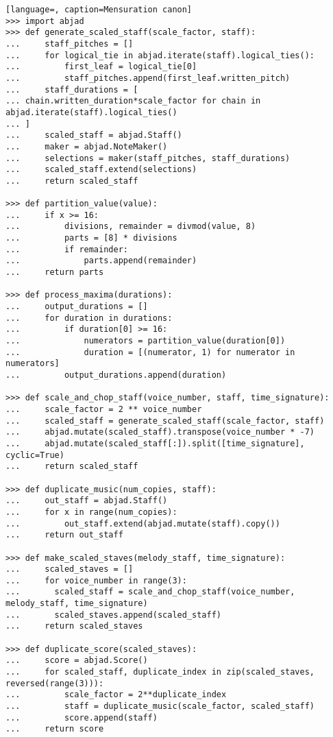 \singlespace
\begin{lstlisting}[language=, caption=Mensuration canon]
>>> import abjad
>>> def generate_scaled_staff(scale_factor, staff):
...     staff_pitches = []
...     for logical_tie in abjad.iterate(staff).logical_ties():
...         first_leaf = logical_tie[0]
...         staff_pitches.append(first_leaf.written_pitch)
...     staff_durations = [
...	chain.written_duration*scale_factor for chain in abjad.iterate(staff).logical_ties()
...	]
...     scaled_staff = abjad.Staff()
...     maker = abjad.NoteMaker()
...     selections = maker(staff_pitches, staff_durations)
...     scaled_staff.extend(selections)
...     return scaled_staff

>>> def partition_value(value):
...     if x >= 16:
...         divisions, remainder = divmod(value, 8)
...         parts = [8] * divisions
...         if remainder:
...             parts.append(remainder)
...     return parts

>>> def process_maxima(durations):
...     output_durations = []
...     for duration in durations:
...         if duration[0] >= 16:
...             numerators = partition_value(duration[0])
...             duration = [(numerator, 1) for numerator in numerators]
...         output_durations.append(duration)

>>> def scale_and_chop_staff(voice_number, staff, time_signature):
...     scale_factor = 2 ** voice_number
...     scaled_staff = generate_scaled_staff(scale_factor, staff)
...     abjad.mutate(scaled_staff).transpose(voice_number * -7)
...     abjad.mutate(scaled_staff[:]).split([time_signature], cyclic=True)
...     return scaled_staff

>>> def duplicate_music(num_copies, staff):
...     out_staff = abjad.Staff()
...     for x in range(num_copies):
...         out_staff.extend(abjad.mutate(staff).copy())
...     return out_staff

>>> def make_scaled_staves(melody_staff, time_signature):
...     scaled_staves = []
...     for voice_number in range(3):
...       scaled_staff = scale_and_chop_staff(voice_number, melody_staff, time_signature)
...       scaled_staves.append(scaled_staff)
...     return scaled_staves

>>> def duplicate_score(scaled_staves):
...     score = abjad.Score()
...     for scaled_staff, duplicate_index in zip(scaled_staves, reversed(range(3))):
...         scale_factor = 2**duplicate_index
...         staff = duplicate_music(scale_factor, scaled_staff)
...         score.append(staff)
...     return score


\end{lstlisting}
